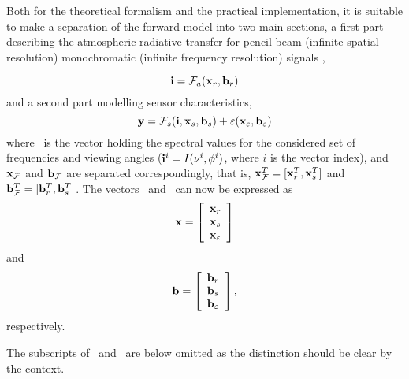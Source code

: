  Both for the theoretical formalism and the practical implementation,
 it is suitable to make a separation of the forward model into two
 main sections, a first part describing the atmospheric radiative
 transfer for pencil beam (infinite spatial resolution) monochromatic
 (infinite frequency resolution) signals \citep{eriksson:99},

 \begin{equation}
   \mathbf{i} = \mathcal{F}_a(\mathbf{x}_r,\mathbf{b}_r)
  \label{eq:formalism:fma}
 \end{equation}
 and a second part modelling sensor characteristics,
 \begin{equation}
   \mathbf{y} = \mathcal{F}_s(\mathbf{i},\mathbf{x}_s,\mathbf{b}_s) + \varepsilon(\mathbf{x}_{\varepsilon},\mathbf{b}_{\varepsilon})
  \label{eq:formalism:fms}
 \end{equation}
 where \iv\ is the vector holding the spectral values for the
 considered set of frequencies and viewing angles
 ($\mathbf{i}^i=I(\nu^i,\phi^i)$, where $i$ is the vector index), and
 $\mathbf{x}_{\mathcal{F}}$ and $\mathbf{b}_{\mathcal{F}}$ are separated correspondingly, that is,
 $\mathbf{x}_{\mathcal{F}}^T= [\mathbf{x}_r^T,\mathbf{x}_s^T]$ and $\mathbf{b}_{\mathcal{F}}^T= [\mathbf{b}_r^T,\mathbf{b}_s^T]$.
 The vectors \xt\ and \bt\ can now be expressed as
 \begin{equation}
   \mathbf{x} = \left[ \begin{array}{c} \mathbf{x}_r\\ \mathbf{x}_s \\ \mathbf{x}_{\varepsilon} \end{array} \right]
 \end{equation}
 and
 \begin{equation}
   \mathbf{b} = \left[ \begin{array}{c} \mathbf{b}_r\\ \mathbf{b}_s \\ \mathbf{b}_{\varepsilon} \end{array}\right],
 \end{equation}
 respectively.

 The subscripts of \xt\ and \bt\ are below omitted as the distinction should be clear by the context. 



 \label{sec:formalism:sensor}
  
